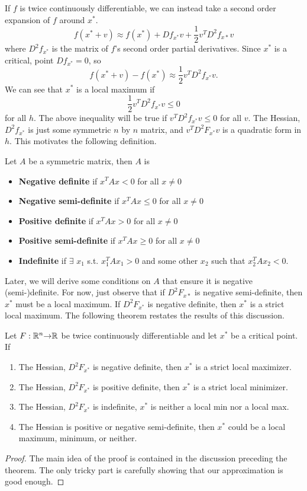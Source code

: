 If $f$ is twice continuously differentiable, we can instead take a
second order expansion of $f$ around $x^*$.
\[ f(x^*+v) \approx f(x^*) + Df_{x^*} v + \frac{1}{2} v^T D^2 f_{x*}
v \] where $D^2 f_{x^*}$ is the matrix of $f$'s second order partial
derivatives.  Since $x^*$ is a critical, point $Df_{x^*} = 0$, so
\[ f(x^*+v) - f(x^*) \approx \frac{1}{2} v^T D^2 f_{x^*} v. \]
We can see that $x^*$ is a local maximum if 
\[ \frac{1}{2} v^T D^2 f_{x^*} v \leq 0 \] for all $h$. The above
inequality will be true if $v^T D^2 f_{x^*} v \leq 0$ for all $v$. The
Hessian, $D^2 f_{x^*}$ is just some symmetric $n$ by $n$ matrix, and
$v^T D^2 F_{x^*} v$ is a quadratic form in $h$. This motivates the
following definition.
\begin{definition}
  Let $A$ be a symmetric matrix, then $A$ is
  \begin{itemize}
  \item \textbf{Negative definite} if $x^T A x < 0$ for all $x \neq 0$
  \item \textbf{Negative semi-definite} if $x^T A x \leq 0$ for all $x \neq 0$
  \item \textbf{Positive definite} if $x^T A x > 0$ for all $x \neq 0$
  \item \textbf{Positive semi-definite} if $x^T A x \geq 0$ for all $x
    \neq 0$
  \item \textbf{Indefinite} if $\exists$ $x_1$ s.t. $x_1^T A x_1 > 0$ and
    some other $x_2$ such that $x_2^T A x_2 < 0$.
  \end{itemize}  
\end{definition}
Later, we will derive some conditions on $A$ that ensure it is
negative (semi-)definite. For now, just observe that if $D^2 F_{x*}$
is negative semi-definite, then $x^*$ must be a local maximum. If
$D^2F_{x^*}$ is negative definite, then $x^*$ is a strict local
maximum. The following theorem restates the results of this
discussion.
\begin{theorem}\label{thm:soc}
  Let $F: \mathbb{R}^n {\rightarrow} \mathbb{R}$ be twice continuously differentiable and
  let $x^*$ be a critical point. If
  \begin{enumerate}
  \item\label{c:smax} The Hessian, $D^2 F_{x^*}$ is negative definite,
    then $x^*$ is a strict local maximizer.  
  \item The Hessian, $D^2 F_{x^*}$ is positive definite, then $x^*$ is
    a strict local minimizer. 
  \item The Hessian, $D^2 F_{x^*}$ is indefinite, $x^*$ is neither a
    local min nor a local max.
  \item\label{c:ambig} The Hessian is positive or negative
    semi-definite, then $x^*$ could be a local maximum, minimum, or
    neither. 
  \end{enumerate}
\end{theorem}
\begin{proof}
  The main idea of the proof is contained in the discussion preceding
  the theorem. The only tricky part is carefully showing
  that our approximation is good enough. 
\end{proof}

